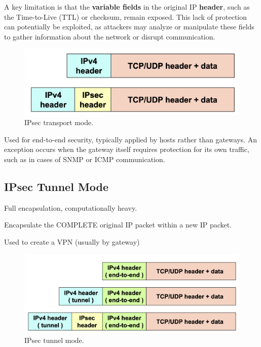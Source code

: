 \begin{multicols}{2}
\raggedcolumns
    A key limitation is that the \textbf{variable fields} in the original IP \textbf{header}, such as the Time-to-Live (TTL) or checksum, remain exposed. This lack of protection can potentially be exploited, as attackers may analyze or manipulate these fields to gather information about the network or disrupt communication.

\columnbreak

\begin{figure}[H]
    \centering
    \includegraphics[width=\linewidth]{Images/NetSec/ipsec_transport_mode.png}
    \caption{IPsec transport mode.}
\end{figure}
\end{multicols}

Used for end-to-end security, typically applied by hosts rather than gateways. An exception occurs when the gateway itself requires protection for its own traffic, such as in cases of SNMP or ICMP communication.

\subsection*{IPsec Tunnel Mode}
\begin{center}
    Full encapsulation, computationally heavy.
\end{center}

\begin{multicols}{2}
\raggedcolumns
    Encapsulate the COMPLETE original IP packet within a new IP packet.

    Used to create a VPN (usually by gateway)
\columnbreak

    
\begin{figure}[H]
    \centering
    \includegraphics[width=\linewidth]{Images/NetSec/ipsec_tunnel_mode.png}
    \caption{IPsec tunnel mode.}
\end{figure}

\end{multicols}
